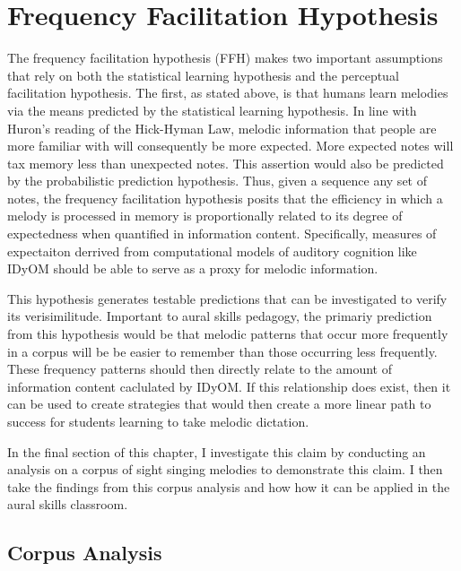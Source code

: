\documentclass[]{book}
\begin{document}
\hypertarget{frequency-facilitation-hypothesis}{%
\section{Frequency Facilitation Hypothesis}\label{frequency-facilitation-hypothesis}}

The frequency facilitation hypothesis (FFH) makes two important assumptions that rely on both the statistical learning hypothesis and the perceptual facilitation hypothesis.
The first, as stated above, is that humans learn melodies via the means predicted by the statistical learning hypothesis.
In line with Huron's reading of the Hick-Hyman Law, melodic information that people are more familiar with will consequently be more expected.
More expected notes will tax memory less than unexpected notes.
This assertion would also be predicted by the probabilistic prediction hypothesis.
Thus, given a sequence any set of notes, the frequency facilitation hypothesis posits that the efficiency in which a melody is processed in memory is proportionally related to its degree of expectedness when quantified in information content.
Specifically, measures of expectaiton derrived from computational models of auditory cognition like IDyOM should be able to serve as a proxy for melodic information.

This hypothesis generates testable predictions that can be investigated to verify its verisimilitude.
Important to aural skills pedagogy, the primariy prediction from this hypothesis would be that melodic patterns that occur more frequently in a corpus will be be easier to remember than those occurring less frequently.
These frequency patterns should then directly relate to the amount of information content caclulated by IDyOM.
If this relationship does exist, then it can be used to create strategies that would then create a more linear path to success for students learning to take melodic dictation.

In the final section of this chapter, I investigate this claim by conducting an analysis on a corpus of sight singing melodies to demonstrate this claim.
I then take the findings from this corpus analysis and how how it can be applied in the aural skills classroom.

\hypertarget{corpus-analysis}{%
\subsection{Corpus Analysis}\label{corpus-analysis}}
\end{document}
